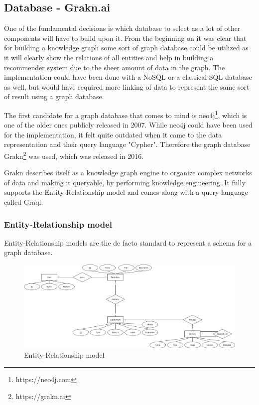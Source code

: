 \subsection{Database - Grakn.ai}
One of the fundamental decisions is which database to select as a lot of other components will have to build upon it. From the beginning on it was clear that for building a knowledge graph some sort of graph database could be utilized as it will clearly show the relations of all entities and help in building a recommender system due to the sheer amount of data in the graph.
The implementation could have been done with a NoSQL or a classical SQL database as well, but would have required more linking of data to represent the same sort of result using a graph database.

The first candidate for a graph database that comes to mind is neo4j\footnote{https://neo4j.com}, which is one of the older ones publicly released in 2007. While neo4j could have been used for the implementation, it felt quite outdated when it came to the data representation and their query language "Cypher". Therefore the graph database Grakn\footnote{https://grakn.ai} was used, which was released in 2016.

Grakn describes itself as a knowledge graph engine to organize complex networks of data and making it queryable, by performing knowledge engineering. It fully supports the Entity-Relationship model and comes along with a query language called Graql. 

\subsubsection{Entity-Relationship model}
Entity-Relationship models are the de facto standard to represent a schema for a graph database.
\begin{figure}[H]
    \centering
    \includegraphics[width=1.2\paperwidth,height=1.2\paperheight,keepaspectratio,angle=270]{graphics/er_database.png}
    \caption{Entity-Relationship model}
    \label{fig:er_model}
\end{figure}

